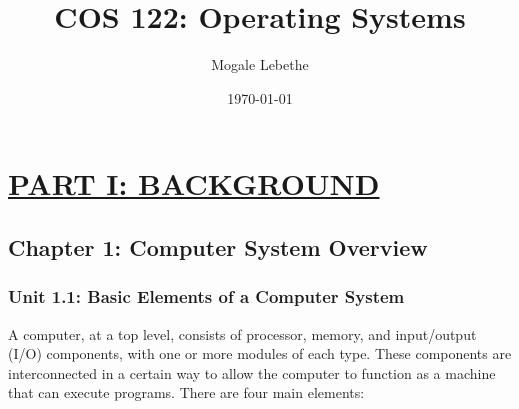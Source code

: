 \documentclass{article}
\title{COS 122: Operating Systems}
\author{Mogale Lebethe}
\date{\today}
\begin{document}
\maketitle

\tableofcontents


\newpage

\section*{\underline{PART I: BACKGROUND}}
{}

\subsection*{Chapter 1: Computer System Overview}
{}

\subsubsection*{Unit 1.1: Basic Elements of a Computer System}
{}

A computer, at a top level, consists of processor, memory, and input/output (I/O) components, with
one or more modules of each type. These components are interconnected in a certain way to allow the computer
to function as a machine that can execute programs. There are four main elements:
\end{document}
